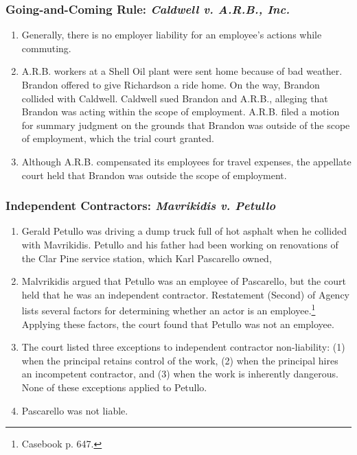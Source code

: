 \subsubsection{Going-and-Coming Rule: \emph{Caldwell v. A.R.B., Inc.}}

\begin{enumerate}
    \item Generally, there is no employer liability for an employee's
    actions while commuting.
    \item A.R.B. workers at a Shell Oil plant were sent home because of bad 
    weather. Brandon offered to give Richardson a ride home. On the way, Brandon 
    collided with Caldwell. Caldwell sued Brandon and A.R.B., alleging that 
    Brandon was acting within the scope of employment. A.R.B. filed a motion for 
    summary judgment on the grounds that Brandon was outside of the scope of 
    employment, which the trial court granted.
    \item Although A.R.B. compensated its employees for travel expenses, the 
    appellate court held that Brandon was outside the scope of employment.
\end{enumerate}

\subsubsection{Independent Contractors: \emph{Mavrikidis v. Petullo}}

\begin{enumerate}
    \item Gerald Petullo was driving a dump truck full of hot asphalt when he 
    collided with Mavrikidis. Petullo and his father had been working on 
    renovations of the Clar Pine service station, which Karl Pascarello owned,
    \item Malvrikidis argued that Petullo was an employee of Pascarello, but the 
    court held that he was an independent contractor. Restatement (Second) of 
    Agency lists several factors for determining whether an actor is an 
    employee.\footnote{Casebook p. 647.} Applying these factors, the court found 
    that Petullo was not an employee.
    \item The court listed three exceptions to independent contractor 
    non-liability: (1) when the principal retains control of the work, (2) when 
    the principal hires an incompetent contractor, and (3) when the work is 
    inherently dangerous. None of these exceptions applied to Petullo.
    \item Pascarello was not liable.
\end{enumerate}

